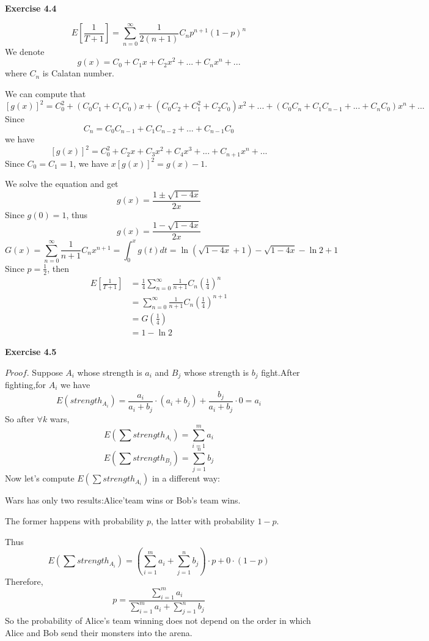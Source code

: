 \documentclass{article} %
\begin{document}
	\textbf{Exercise 4.4}\par
	$$E[\frac{1}{T+1}]=\sum_{n=0}^\infty \frac{1}{2(n+1)}C_{n}p^{n+1}(1-p)^{n}$$
	We denote $$g(x)=C_0+C_1x+C_2x^2+...+C_{n}x^{n}+...$$ where $C_{n}$ is Calatan number.\par
	We can compute that $$[g(x)]^2=C_0^2+(C_0C_1+C_1C_0)x+(C_0C_2+C_1^2+C_2C_0)x^2+...+(C_0C_{n}+C_1C_{n-1}+...+C_{n}C_0)x^{n}+...$$
	Since $$C_{n}=C_0C_{n-1}+C_1C_{n-2}+...+C_{n-1}C_0$$
	we have $$[g(x)]^2=C_0^2+C_2x+C_3x^2+C_4x^3+...+C_{n+1}x^{n}+...$$
	Since $C_0=C_1=1$, we have $x[g(x)]^2=g(x)-1$.\par
	We solve the equation and get
	$$g(x)=\frac{1\pm\sqrt{1-4x}}{2x}$$
	Since $g(0)=1$, thus 
	$$g(x)=\frac{1-\sqrt{1-4x}}{2x}$$
	$$G(x)=\sum_{n=0}^\infty \frac{1}{n+1}C_{n}x^{n+1}=\int_{0}^{x} g(t)dt=\ln(\sqrt{1-4x}+1)-\sqrt{1-4x}-\ln 2+1$$
	Since $p=\frac{1}{2}$, then 
	\begin{align*}
	E[\frac{1}{T+1}]&=\frac{1}{4}\sum_{n=0}^\infty \frac{1}{n+1}C_{n}(\frac{1}{4})^n\\
	&=\sum_{n=0}^\infty \frac{1}{n+1}C_{n}(\frac{1}{4})^{n+1}\\
	&=G(\frac{1}{4})\\
	&=1-\ln 2
	\end{align*}

    \textbf{Exercise 4.5}\par
    $Proof$.
    Suppose $A_i$ whose strength is $a_i$ and $B_j$ whose strength is $b_j$ fight.After fighting,for $A_i$ we have
    $$
    E(strength_{A_i})=\frac{a_i}{a_i+b_j}\cdot (a_i+b_j)+\frac{b_j}{a_i+b_j}\cdot 0=a_i
    $$
    So after $\forall k$ wars,
    $$
    E(\sum strength_{A_i})=\sum_{i=1}^{m}a_i
    $$
    $$
    E(\sum strength_{B_j})=\sum_{j=1}^{n}b_j
    $$
    Now let's compute $E(\sum strength_{A_i})$ in a different way:\par
    Wars has only two results:Alice'team wins or Bob's team wins.\par
    The former happens with probability $p$,
    the latter with probability $1-p$.\par
    Thus
    $$
    E(\sum strength_{A_i})=(\sum_{i=1}^{m}a_i+\sum_{j=1}^{n}b_j)\cdot p+0\cdot (1-p)
    $$
    Therefore,
    $$
    p=\frac{\sum_{i=1}^{m}a_i}{\sum_{i=1}^{m}a_i+\sum_{j=1}^{n}b_j}
    $$
    So the probability of Alice's team winning does not depend on the order in which Alice and Bob send their monsters into the arena.
\end{document}
